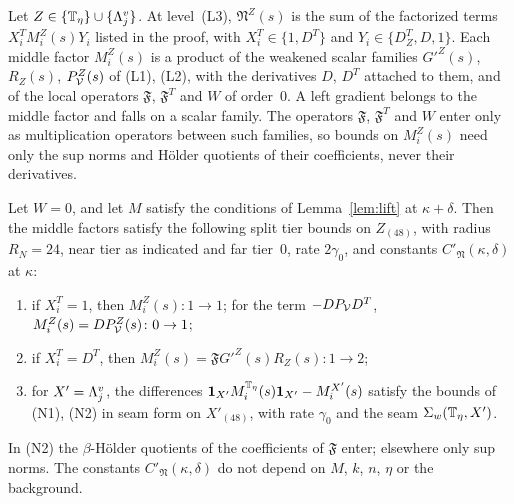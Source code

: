 \begin{lemma}\label{lem:N-tier}
Let $Z\in\{\mathbb T_\eta\}\cup\{\Lambda^v_j\}$. At level~(L3), $\mathfrak N^Z(s)$ is the sum of the factorized terms $X_i^TM_i^Z(s)Y_i$ listed in the proof, with $X_i^T\in\{1,D^T\}$ and $Y_i\in\{D^T_Z,D,1\}$. Each middle factor $M_i^Z(s)$ is a product of the weakened scalar families $G'^Z(s)$, $R_Z(s)$, $P^Z_\mathcal V(s)$ of (L1), (L2), with the derivatives $D$, $D^T$ attached to them, and of the local operators $\mathfrak F$, $\mathfrak F^T$ and $W$ of order~$0$. A left gradient belongs to the middle factor and falls on a scalar family. The operators $\mathfrak F$, $\mathfrak F^T$ and $W$ enter only as multiplication operators between such families, so bounds on $M_i^Z(s)$ need only the sup norms and H\"older quotients of their coefficients, never their derivatives.

Let $W=0$, and let $M$ satisfy the conditions of Lemma~\ref{lem:lift} at $\kappa+\delta$. Then the middle factors satisfy the following split tier bounds on $Z_{(48)}$, with radius $R_N=24$, near tier as indicated and far tier~$0$, rate $2\gamma_0$, and constants $C'_{\mathfrak N}(\kappa,\delta)$ at $\kappa$:
\begin{enumerate}[label=(N\arabic*)]
\item if $X_i^T=1$, then $M_i^Z(s)\colon1\to1$; for the term $-DP_\mathcal V D^T$, $M_i^Z(s)=DP^Z_\mathcal V(s)\colon0\to1$;
\item if $X_i^T=D^T$, then $M_i^Z(s)=\mathfrak FG'^Z(s)R_Z(s)\colon1\to2$;
\item for $X'=\Lambda^v_j$, the differences $\mathbf 1_{X'}M_i^{\mathbb T_\eta}(s)\mathbf 1_{X'}-M_i^{X'}(s)$ satisfy the bounds of (N1), (N2) in seam form on $X'_{(48)}$, with rate $\gamma_0$ and the seam $\Sigma_w(\mathbb T_\eta,X')$.
\end{enumerate}
In (N2) the $\beta$-H\"older quotients of the coefficients of $\mathfrak F$ enter; elsewhere only sup norms. The constants $C'_{\mathfrak N}(\kappa,\delta)$ do not depend on $M$, $k$, $n$, $\eta$ or the background.
\end{lemma}

